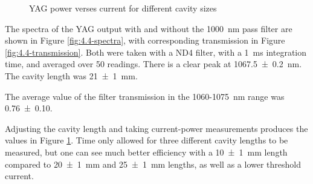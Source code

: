 \documentclass[a4paper]{scrartcl}
\begin{document}
\begin{figure}
    \centering
    \caption{YAG power verses current for different cavity sizes}
    \label{fig:4.4-power}
\end{figure}

The spectra of the YAG output with and without the \SI{1000}{\nano\metre} pass filter are shown in Figure \ref{fig:4.4-spectra}, with corresponding transmission in Figure \ref{fig:4.4-transmission}. Both were taken with a ND4 filter, with a \SI{1}{\milli\second} integration time, and averaged over 50 readings. There is a clear peak at \SI{1067.5 \pm 0.2}{\nano\metre}. The cavity length was \SI{21 \pm 1}{\milli\metre}.

The average value of the filter transmission in the 1060-\SI{1075}{\nano\metre} range was \SI{0.76 \pm 0.10}{}.

Adjusting the cavity length and taking current-power measurements produces the values in Figure \ref{fig:4.4-power}. Time only allowed for three different cavity lengths to be measured, but one can see much better efficiency with a \SI{10 \pm 1}{\milli\metre} length compared to \SI{20 \pm 1}{\milli\metre} and \SI{25 \pm 1}{\milli\metre} lengths, as well as a lower threshold current.
\end{document}
